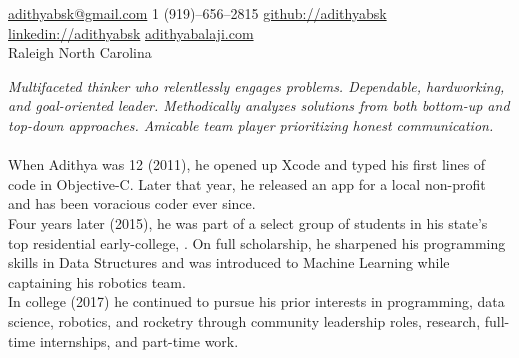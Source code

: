 \documentclass[10pt,letterpaper]{article}
\begin{document}
\sloppy  %


\nobreakvspace{0.3em}  %

\noindent
\href{mailto:adithyabsk@gmail.com}{adithyabsk\mbox{}@\mbox{}gmail.com}\sbull{}
\textsmaller{+}1 (919)--656--2815\sbull{}
\href{https://github.com/adithyabsk}{github://adithyabsk}\sbull{}
\href{https://linkedin.com/in/adithyabsk}{linkedin://adithyabsk}\sbull{}
\href{https://www.adithyabalaji.com}{adithyabalaji.com}\\
Raleigh\sbull{}
North Carolina\spacedhrule{0.9em}{-0.4em}  %


\vspace{-1.3em}  %
\begin{multicols}{2}  %
	\noindent
	\emph{Multifaceted thinker who relentlessly engages problems.
		Dependable, hardworking, and goal-oriented leader.
		Methodically analyzes solutions from both bottom-up and top-down approaches. Amicable team player prioritizing honest communication.
	}
	\\
	\\
	When Adithya was 12 (2011), he opened up Xcode and typed his first lines of code in Objective-C.
	Later that year, he released an  app for a local non-profit and has been voracious coder ever since.\\

	Four years later (2015), he was part of a select group of students in his state's top residential early-college, .
	On full scholarship, he sharpened his programming skills in Data Structures and was introduced to Machine Learning while captaining his robotics team.\\

	In college (2017) he continued to pursue his prior interests in programming, data science, robotics, and rocketry through community leadership roles, research, full-time internships, and part-time work.
\end{multicols}\spacedhrule{0em}{-0.4em}
\end{document}
